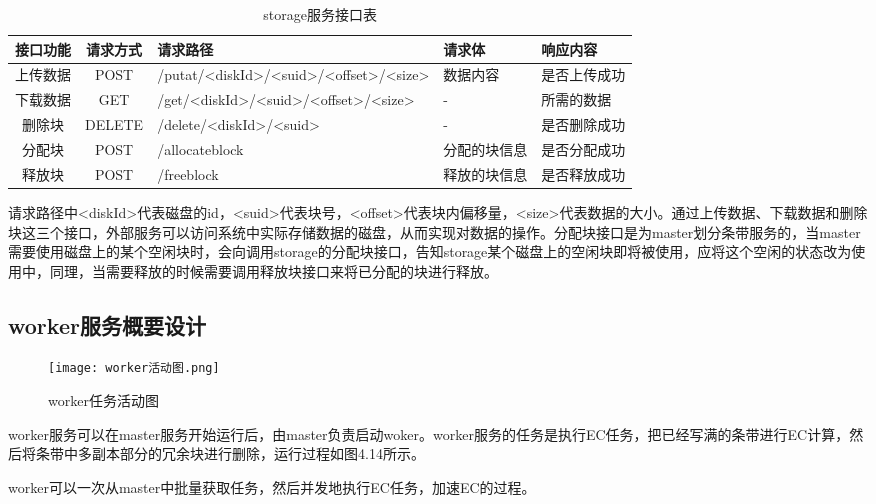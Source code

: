 \begin{table}[h]
    \centering
    \caption{storage服务接口表}
    \begin{tabular}{ccp{4cm}p{2cm}p{3cm}}
      \toprule
      接口功能   & 请求方式    & 请求路径     & 请求体    & 响应内容                     \\
      \midrule
      上传数据      & POST   & /putat/<diskId>/<suid>\newline/<offset>/<size> & 数据内容      & 是否上传成功\\
      下载数据      & GET    & /get/<diskId>\newline/<suid>/<offset>/<size>   & -            & 所需的数据\\
      删除块        & DELETE & /delete/<diskId>/<suid>                        & -            & 是否删除成功\\
      分配块        & POST   & /allocateblock                                 & 分配的块信息  & 是否分配成功\\
      释放块        & POST   & /freeblock                                     & 释放的块信息  & 是否释放成功\\
      \bottomrule
    \end{tabular}
\end{table}	

请求路径中<diskId>代表磁盘的id，<suid>代表块号，<offset>代表块内偏移量，<size>代表数据的大小。通过上传数据、下载数据和删除块这三个接口，外部服务可以访问系统中实际存储数据的磁盘，从而实现对数据的操作。分配块接口是为master划分条带服务的，当master需要使用磁盘上的某个空闲块时，会向调用storage的分配块接口，告知storage某个磁盘上的空闲块即将被使用，应将这个空闲的状态改为使用中，同理，当需要释放的时候需要调用释放块接口来将已分配的块进行释放。

\subsection{worker服务概要设计}

\begin{figure}[h]
  \centering
  \texttt{[image: worker活动图.png]}
  \caption{worker任务活动图}
\end{figure}

worker服务可以在master服务开始运行后，由master负责启动woker。worker服务的任务是执行EC任务，把已经写满的条带进行EC计算，然后将条带中多副本部分的冗余块进行删除，运行过程如图4.14所示。

worker可以一次从master中批量获取任务，然后并发地执行EC任务，加速EC的过程。


